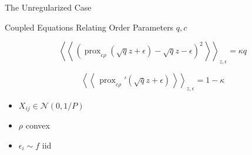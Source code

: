 \documentclass[pdf]{beamer}
\DeclareMathOperator{\prox}{prox}
\newcommand{\qav}[1]{\mbox{$\left\langle\left\langle \, #1 \, \right\rangle\right\rangle$}}
\begin{document}
\begin{frame}{The Unregularized Case}



\begin{block}{\begin{center}Coupled Equations Relating Order Parameters $q,c$ \end{center}}
\begin{equation*}
\qav{\left(\prox_{c\rho}{(\sqrt{q} z + \epsilon)} -\sqrt{q}z -\epsilon\right)^2}_{z,\epsilon}= \kappa q
\end{equation*}


\begin{equation*}
\qav{\prox_{c\rho}'(\sqrt{q}z + \epsilon)}_{z, \epsilon} = 1-\kappa
\end{equation*}
\end{block}

\vspace{.1in}

\begin{itemize}
    \item $X_{ij}\in \mathcal{N}(0,1/P)$
    \item $\rho$ convex
    \item $\epsilon_i\sim f$ iid
\end{itemize}

\end{frame}
\end{document}
